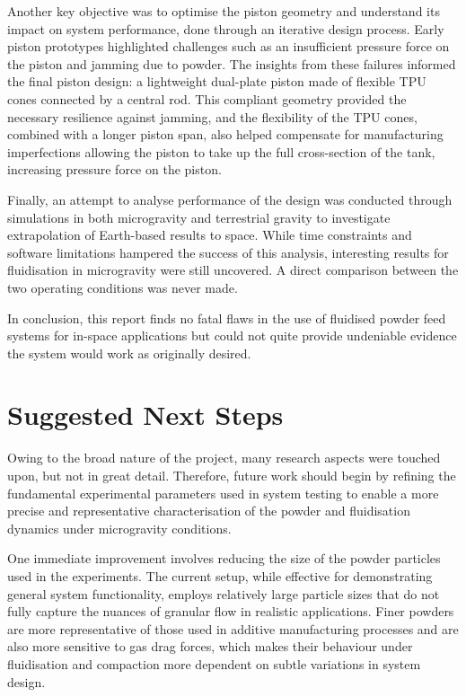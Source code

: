 Another key objective was to optimise the piston geometry and understand its impact on system performance, done through an iterative design process. Early piston prototypes highlighted challenges such as an insufficient pressure force on the piston and jamming due to powder. The insights from these failures informed the final piston design: a lightweight dual-plate piston made of flexible TPU cones connected by a central rod. This compliant geometry provided the necessary resilience against jamming, and the flexibility of the TPU cones, combined with a longer piston span, also helped compensate for manufacturing imperfections allowing the piston to take up the full cross-section of the tank, increasing pressure force on the piston. 

Finally, an attempt to analyse performance of the design was conducted through simulations in both microgravity and terrestrial gravity to investigate extrapolation of Earth-based results to space. While time constraints and software limitations hampered the success of this analysis, interesting results for fluidisation in microgravity were still uncovered. A direct comparison between the two operating conditions was never made.

In conclusion, this report finds no fatal flaws in the use of fluidised powder feed systems for in-space applications but could not quite provide undeniable evidence the system would work as originally desired.

\section{Suggested Next Steps}
Owing to the broad nature of the project, many research aspects were touched upon, but not in great detail. Therefore, future work should begin by refining the fundamental experimental parameters used in system testing to enable a more precise and representative characterisation of the powder and fluidisation dynamics under microgravity conditions. 

One immediate improvement involves reducing the size of the powder particles used in the experiments. The current setup, while effective for demonstrating general system functionality, employs relatively large particle sizes that do not fully capture the nuances of granular flow in realistic applications. Finer powders are more representative of those used in additive manufacturing processes and are also more sensitive to gas drag forces, which makes their behaviour under fluidisation and compaction more dependent on subtle variations in system design. 

